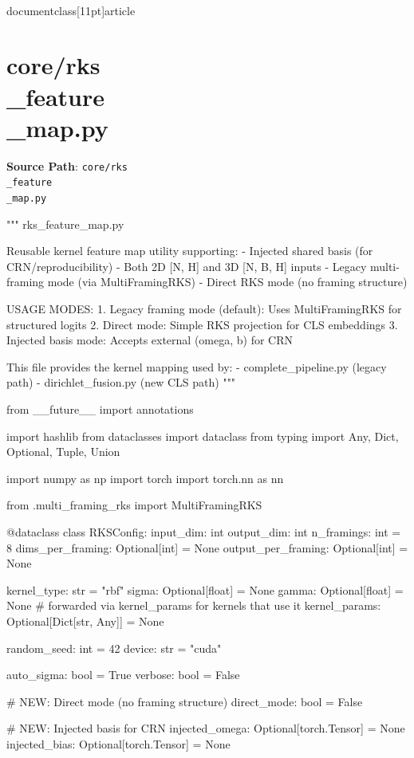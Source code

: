 \\documentclass[11pt]{article}
\begin{document}
\section*{core/rks\\_feature\\_map.py}
\textbf{Source Path}: \texttt{core/rks\\_feature\\_map.py}\par
\bigskip
\begin{CodeBlock}
"""
rks_feature_map.py

Reusable kernel feature map utility supporting:
- Injected shared basis (for CRN/reproducibility)
- Both 2D [N, H] and 3D [N, B, H] inputs
- Legacy multi-framing mode (via MultiFramingRKS)
- Direct RKS mode (no framing structure)

USAGE MODES:
1. Legacy framing mode (default): Uses MultiFramingRKS for structured logits
2. Direct mode: Simple RKS projection for CLS embeddings
3. Injected basis mode: Accepts external (omega, b) for CRN

This file provides the kernel mapping used by:
- complete_pipeline.py (legacy path)
- dirichlet_fusion.py (new CLS path)
"""

from __future__ import annotations

import hashlib
from dataclasses import dataclass
from typing import Any, Dict, Optional, Tuple, Union

import numpy as np
import torch
import torch.nn as nn

from .multi_framing_rks import MultiFramingRKS


@dataclass
class RKSConfig:
    input_dim: int
    output_dim: int
    n_framings: int = 8
    dims_per_framing: Optional[int] = None
    output_per_framing: Optional[int] = None

    kernel_type: str = "rbf"
    sigma: Optional[float] = None
    gamma: Optional[float] = None  # forwarded via kernel_params for kernels that use it
    kernel_params: Optional[Dict[str, Any]] = None

    random_seed: int = 42
    device: str = "cuda"

    auto_sigma: bool = True
    verbose: bool = False
    
    # NEW: Direct mode (no framing structure)
    direct_mode: bool = False
    
    # NEW: Injected basis for CRN
    injected_omega: Optional[torch.Tensor] = None
    injected_bias: Optional[torch.Tensor] = None
    

\end{CodeBlock}
\end{document}
